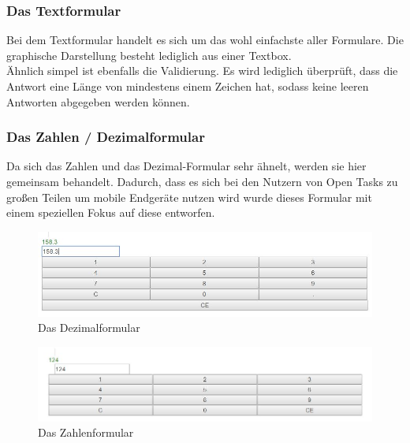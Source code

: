 \subsubsection{Das Textformular}

Bei dem Textformular handelt es sich um das wohl einfachste aller Formulare. Die graphische Darstellung besteht lediglich aus einer Textbox. \\
Ähnlich simpel ist ebenfalls die Validierung. Es wird lediglich überprüft, dass die Antwort eine Länge von mindestens einem Zeichen hat, sodass keine leeren Antworten abgegeben werden können.

\subsubsection{Das Zahlen / Dezimalformular}

Da sich das Zahlen und das Dezimal-Formular sehr ähnelt, werden sie hier gemeinsam behandelt. Dadurch, dass es sich bei den Nutzern von Open Tasks zu großen Teilen um mobile Endgeräte nutzen wird wurde dieses Formular mit einem speziellen Fokus auf diese entworfen.

\begin{figure}[htp]     %
\centering
\includegraphics[width=1\textwidth]{bilder/DezimalForm} 
\caption[Das Dezimalformular]{Das Dezimalformular}
\end{figure} 

\begin{figure}[htp]     %
\centering
\includegraphics[width=1\textwidth]{bilder/NumberForm} 
\caption[Das Zahlenformular]{Das Zahlenformular}
\end{figure} 

